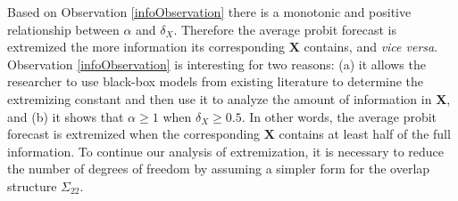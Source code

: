 \documentclass[11pt,twoside]{article}
\newtheorem{observation}[theorem]{Observation}
\begin{document}
Based on Observation \ref{infoObservation} there is a monotonic and positive relationship between $\alpha$ and $\delta_X$. Therefore the average probit forecast is extremized the more information its corresponding $\boldsymbol{X}$ contains, and \textit{vice versa}. Observation \ref{infoObservation}  is interesting for two reasons: (a) it allows the researcher to use black-box models from existing literature to determine the extremizing constant and then use it to analyze the amount of information in $\boldsymbol{X}$, and (b) it shows that $\alpha \geq 1$ when $\delta_X \geq 0.5$.  In other words, the average probit forecast is extremized when the corresponding $\boldsymbol{X}$ contains at least half of the full information.  
%
To continue our analysis of extremization, it is necessary to reduce the number of degrees of freedom by assuming a simpler form for the overlap structure $\Sigma_{22}$. 
\end{document}
